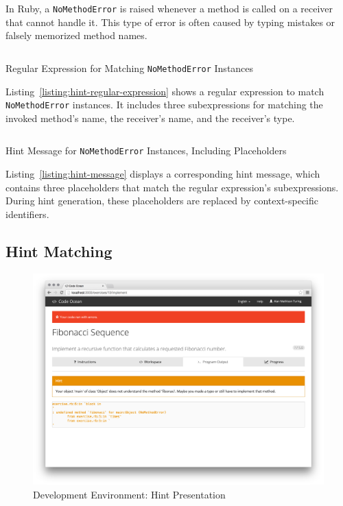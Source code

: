 In Ruby, a \texttt{NoMethodError} is raised whenever a method is called on a receiver that cannot handle it. This type of error is often caused by typing mistakes or falsely memorized method names.

\begin{listing}
\inputminted[frame=lines]{rb}{listings/hint-regular-expression.rb}
\vspace{-0.33cm}
\caption{Regular Expression for Matching \texttt{NoMethodError} Instances}
\label{listing:hint-regular-expression}
\end{listing}

Listing~\ref{listing:hint-regular-expression} shows a regular expression to match \texttt{NoMethodError} instances. It includes three subexpressions for matching the invoked method's name, the receiver's name, and the receiver's type.

\begin{listing}
\inputminted[frame=lines]{text}{listings/hint-message.txt}
\vspace{-0.33cm}
\caption{Hint Message for \texttt{NoMethodError} Instances, Including Placeholders}
\label{listing:hint-message}
\end{listing}

Listing~\ref{listing:hint-message} displays a corresponding hint message, which contains three placeholders that match the regular expression's subexpressions. During hint generation, these placeholders are replaced by context-specific identifiers.

\subsection{Hint Matching}

\begin{figure}
\centering
\includegraphics[width=\textwidth]{images/development-environment2.png}
\vspace{-1cm}
\caption{Development Environment: Hint Presentation}
\label{figure:development-environment2}
\end{figure}

